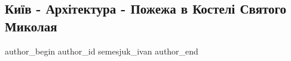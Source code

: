  
 
 
 
 
 
\subsection{Київ - Архітектура - Пожежа в Костелі Святого Миколая}
\label{sec:06_09_2021.fb.semesjuk_ivan.1.kiev_pozhar_kostel_arhitektura}
 
\ifcmt
 author_begin
   author_id semesjuk_ivan
 author_end
\fi

